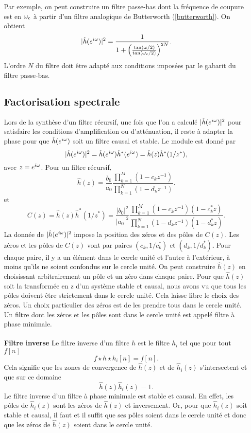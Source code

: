 Par exemple,
on peut construire un filtre passe-bas dont la fr\'equence
de coupure est en ${\omega}_c$ \`a partir d'un filtre analogique de
Butterworth (\ref{butterworth}).
On obtient
\[
|\hat h({e ^{i \omega}})|^2 = \frac 1 {1 + \left(
\frac {\tan ({\omega}/2)} {\tan ({\omega}_c /2)}\right)^{2N}} .
\]
L'ordre $N$ du filtre doit \^etre adapt\'e aux conditions
impos\'ees
par le gabarit du filtre passe-bas.

\subsection{Factorisation spectrale}

Lors de la synth\`ese d'un filtre r\'ecursif,
une fois que l'on a calcul\'e
$|\hat h({e ^{i \omega}})|^2$ pour satisfaire les conditions d'amplification
ou d'att\'enuation, il reste \`a
adapter la phase pour que $\hat h ({e ^{i \omega}})$ soit un filtre
causal et stable. Le module est donn\'e par
\[
|\hat h({e ^{i \omega}})|^2 = \hat h({e ^{i \omega}}) \hat h^* ({e ^{i \omega}}) = \hat h(z)
\hat h^* (1 / z^* ) ,
\]
avec $z = {e ^{i \omega}}$.
Pour un filtre r\'ecursif,
\[
\hat h(z) = \frac {b_0} {a_0} \frac
{\prod_{k=1}^M (1 - c_k z^{-1})} {\prod_{k=1}^N (1 - d_k z^{-1})} .
\]
et
\[
C(z) = \hat h(z) \hat h^* (1 / z^* ) =
\frac {|b_0|^2} {|a_0|^2} \frac
{\prod_{k=1}^M (1 - c_k z^{-1})(1 -  c^*_k  z)
} {\prod_{k=1}^N (1 - d_k z^{-1})(1 - d^*_k z)} .
\]
La donn\'ee de $|\hat h({e ^{i \omega}})|^2$ impose la position des z\'eros et
des p\^oles de $C(z)$. Les z\'eros et les p\^oles de $C(z)$
vont par paires $(c_k, 1/{ c^*_k})$ et
$(d_k, 1/{d^*_k})$. Pour chaque paire, il y a un \'el\'ement
dans le cercle unit\'e et l'autre \`a l'ext\'erieur, \`a moins qu'ils
ne soient confondus sur le cercle unit\'e.
On peut construire $\hat h(z)$ en choisissant
arbitrairement un p\^ole et un z\'ero dans
chaque paire.
Pour que $\hat h(z)$ soit la transform\'ee en z d'un syst\`eme
stable
et causal, nous avons vu que tous les p\^oles doivent \^etre
strictement dans le
cercle unit\'e. Cela laisse libre le choix des z\'eros.
Un choix particulier des z\'eros est de les prendre tous
dans le cercle unit\'e. Un filtre dont les z\'eros et les p\^oles
sont dans le cercle unit\'e est appel\'e filtre \`a phase minimale.
\\
\\
{\bf Filtre inverse}
Le filtre inverse d'un filtre $h$ est
le filtre $h_i$ tel que
pour tout $f[n]$
\[
f \star h \star h_i [n] = f[n] .
\]
Cela signifie que les zones de convergence
de $\hat h (z)$ et de $\hat h_i (z)$ s'intersectent et que
sur ce domaine
\[
\hat h(z) \hat h_i (z) = 1.
\]
Le filtre inverse d'un filtre \`a phase minimale
est stable et causal.
En effet,
les p\^oles de $\hat h_i (z)$ sont les z\'eros
de $\hat h(z)$ et inversement.
Or, pour que $\hat h_i (z)$ soit stable et causal, il faut et
il suffit que ses
p\^oles soient dans le cercle unit\'e et donc que les z\'eros de
$\hat h(z)$ soient dans le cercle unit\'e.

